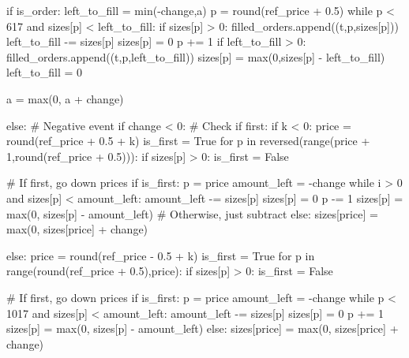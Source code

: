             if is_order:
                left_to_fill = min(-change,a)
                p = round(ref_price + 0.5)
                while p < 617 and sizes[p] < left_to_fill:
                    if sizes[p] > 0:
                        filled_orders.append((t,p,sizes[p]))
                    left_to_fill -= sizes[p]
                    sizes[p] = 0
                    p += 1
                if left_to_fill > 0:
                    filled_orders.append((t,p,left_to_fill))
                sizes[p] = max(0,sizes[p] - left_to_fill)
                left_to_fill = 0
                
                a = max(0, a + change)
            
            else:    
                # Negative event
                if change < 0:
                    # Check if first:
                    if k < 0:
                        price = round(ref_price + 0.5 + k)
                        is_first = True
                        for p in reversed(range(price + 1,round(ref_price + 0.5))):
                            if sizes[p] > 0:
                                is_first = False

                        # If first, go down prices
                        if is_first:
                            p = price
                            amount_left = -change
                            while i > 0 and sizes[p] < amount_left:
                                amount_left -= sizes[p]
                                sizes[p] = 0
                                p -= 1
                            sizes[p] = max(0, sizes[p] - amount_left)
                        # Otherwise, just subtract
                        else:
                            sizes[price] = max(0, sizes[price] + change) 

                    else:
                        price = round(ref_price - 0.5 + k)
                        is_first = True
                        for p in range(round(ref_price + 0.5),price):
                            if sizes[p] > 0:
                                is_first = False

                        # If first, go down prices
                        if is_first:
                            p = price
                            amount_left = -change
                            while p < 1017 and sizes[p] < amount_left:
                                amount_left -= sizes[p]
                                sizes[p] = 0
                                p += 1
                            sizes[p] = max(0, sizes[p] - amount_left)
                        else:
                            sizes[price] = max(0, sizes[price] + change)

